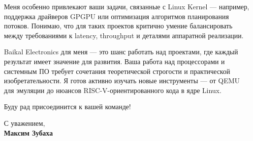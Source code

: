 \documentclass[11pt]{report}
\begin{document}
\begin{titlepage}
\begin{large}
Меня особенно привлекают ваши задачи, связанные с Linux Kernel — например, поддержка драйверов GPGPU или оптимизация алгоритмов планирования потоков. Понимаю, что для таких проектов критично умение балансировать между требованиями к latency, throughput и деталями аппаратной реализации. 

\vspace{0.7em}

Baikal Electronics для меня — это шанс работать над проектами, где каждый результат имеет значение для развития. Ваша работа над процессорами и системным ПО требует сочетания теоретической строгости и практической изобретательности. Я готов активно изучать новые инструменты — от QEMU для эмуляции до нюансов RISC-V-ориентированного кода в ядре Linux.

\vspace{0.7em}

Буду рад присоединится к вашей команде!

\vspace{0.7em}

\raggedright С уважением,\\
\textbf{Максим Зубаха}

\vspace{1.0em}

\end{large}

\end{titlepage}
\end{document}
